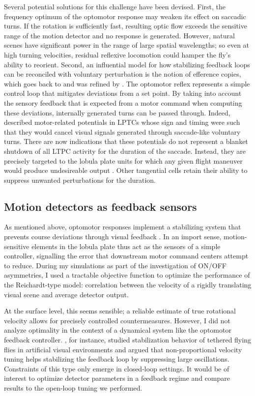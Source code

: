 Several potential solutions for this challenge have been devised. First, the frequency optimum of the optomotor response may weaken its effect on saccadic turns. If the rotation is sufficiently fast, resulting optic flow exceeds the sensitive range of the motion detector and no response is generated. However, natural scenes have significant power in the range of large spatial wavelengths; so even at high turning velocities, residual reflexive locomotion could hamper the fly's ability to reorient. Second, an influential model for how stabilizing feedback loops can be reconciled with voluntary perturbation is the notion of efference copies, which goes back to \citet{Helmholtz:1867aa} and was refined by \citet{Holst:1950aa}. The optomotor reflex represents a simple control loop that mitigates deviations from a set point. By taking into account the sensory feedback that is expected from a motor command when computing these deviations, internally generated turns can be passed through. Indeed, \citet{Kim:2015kr} described motor-related potentials in LPTCs whose sign and timing were such that they would cancel visual signals generated through saccade-like voluntary turns. There are now indications that these potentials do not represent a blanket shutdown of all LTPC activity for the duration of the saccade. Instead, they are precisely targeted to the lobula plate units for which any given flight maneuver would produce undesireable output \citep{Kim:2017aa}. Other tangential cells retain their ability to suppress unwanted perturbations for the duration.

\subsection{Motion detectors as feedback sensors}
As mentioned above, optomotor responses implement a stabilizing system that prevents course deviations through visual feedback \citep{Goetz:1965aa}. In an import sense, motion-sensitive elements in the lobula plate thus act as the sensors of a simple controller, signalling the error that downstream motor command centers attempt to reduce. During my simulations as part of the investigation of ON/OFF asymmetries, I used a tractable objective function to optimize the performance of the Reichardt-type model: correlation between the velocity of a rigidly translating visual scene and average detector output. 

At the surface level, this seems sensible; a reliable estimate of true rotational velocity allows for precisely controlled countermeasures. However, I did not analyze optimality in the context of a dynamical system like the optomotor feedback controller. \citet{Warzecha:1996bm}, for instance, studied stabilization behavior of tethered flying flies in artificial visual environments and argued that non-proportional velocity tuning helps stabilizing the feedback loop by suppressing large oscillations. Constraints of this type only emerge in closed-loop settings. It would be of interest to optimize detector parameters in a feedback regime and compare results to the open-loop tuning we performed.

